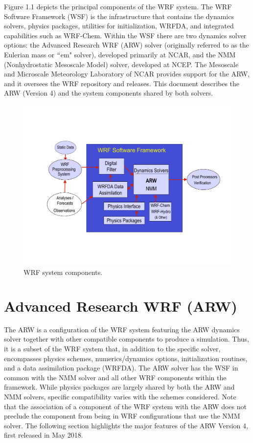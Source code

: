 Figure 1.1 depicts the principal components of the WRF system. 
The WRF Software Framework (WSF) is the infrastructure 
that contains the dynamics solvers, physics packages, utilities
for initialization, WRFDA, and integrated capabilities such as WRF-Chem.  
Within the WSF there are two dynamics solver options: the 
Advanced Research WRF (ARW) solver (originally referred to
as the Eulerian mass or $``$em" solver), developed primarily at NCAR, and
the NMM (Nonhydrostatic Mesoscale Model) solver, developed at NCEP.
The Mesoscale and Microscale Meteorology Laboratory of NCAR provides
support for the ARW, and it oversees the WRF repository and releases.
This document describes the ARW (Version 4) and the system components 
shared by both solvers.


%
%
\begin{figure}
  \centering
  \includegraphics[width=6.5in]{figures/component.pdf}
  \caption{\label{figure:1}WRF system components.}
\end{figure}

\section {Advanced Research WRF (ARW)}

The ARW is a configuration of the WRF system featuring
the ARW dynamics solver together with other compatible components 
to produce a simulation.  Thus, 
it is a subset of the WRF system that, in addition to the specific solver, 
encompasses physics schemes, numerics/dynamics options, 
initialization routines, and a data assimilation package (WRFDA).  
The ARW solver has the WSF in common with the NMM solver and all other 
WRF components within the framework.  While physics packages are 
largely shared by both the ARW and NMM solvers, specific 
compatibility varies with the schemes considered.  
Note that the association of a component of the WRF system with 
the ARW does not preclude the component from being in
WRF configurations that use the NMM solver.  
The following section highlights the major features of the 
ARW Version 4, first released in May 2018.

